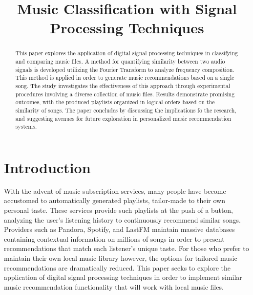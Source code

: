 \documentclass[conference]{IEEEtran}
\begin{document}
\title{Music Classification with Signal Processing Techniques}
\author{
  \and
  \and
  }

\maketitle
\begin{abstract}
This paper explores the application of digital signal processing techniques in classifying and comparing music files. A method for quantifying similarity between two audio signals is developed utilizing the Fourier Transform to analyze frequency composition. This method is applied in order to generate music recommendations based on a single song. The study investigates the effectiveness of this approach through experimental procedures involving a diverse collection of music files. Results demonstrate promising outcomes, with the produced playlists organized in logical orders based on the similarity of songs. The paper concludes by discussing the implications fo the research, and suggesting avenues for future exploration in personalized music recommendation systems.
\end{abstract}

\section{Introduction}\label{sec:Introduction}
With the advent of music subscription services, many people have become accustomed to automatically generated playlists, tailor-made to their own personal taste. These services provide such playlists at the push of a button, analyzing the user's listening history to continuously recommend similar songs. Providers such as Pandora, Spotify, and LastFM maintain massive databases containing contextual information on millions of songs in order to present recommendations that match each listener's unique taste. For those who prefer to maintain their own local music library however, the options for tailored music recommendations are dramatically reduced. This paper seeks to explore the application of digital signal processing techniques in order to implement similar music recommendation functionality that will work with local music files.
\end{document}
